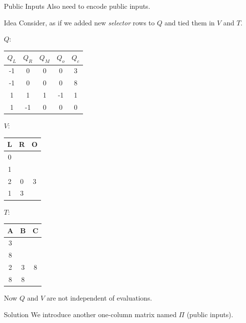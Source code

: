 \documentclass{zkdl-presentation-template}
\begin{document}
    \begin{frame}{Public Inputs}
        Also need to encode public inputs.
        \begin{block}{Idea}
            Consider, as if we added new \textit{selector} rows to $Q$ and tied them in $V$ and $T$.
        \end{block}

        \begin{example}
            \scriptsize
            \begin{center}
            $Q$: 
                \begin{tabular}{|c|c|c|c|c|}
                    \hline
                    $Q_L$ & $Q_R$ & $Q_M$ & $Q_o$ & $Q_c$ \\ 
                    \hline
                    -1 & 0 & 0 & 0 & 3 \\ 
                    \hline
                    -1 & 0 & 0 & 0 & 8 \\ 
                    \hline
                    1 & 1 & 1 & -1 & 1 \\ 
                    \hline
                    1 & -1 & 0 & 0 & 0 \\ 
                    \hline
                \end{tabular}
            \quad $V$:
                \begin{tabular}{|c|c|c|}
                    \hline
                    L & R & O \\
                    \hline
                    0 &  &  \\
                    \hline
                    1 &  &  \\
                    \hline
                    2 & 0 & 3 \\
                    \hline
                    1 & 3 &  \\
                    \hline
                \end{tabular}
             \quad $T$:
                \begin{tabular}{|c|c|c|}
                    \hline
                    A & B & C \\
                    \hline
                    3 &  &  \\
                    \hline
                    8 &  &  \\
                    \hline
                    2 & 3 & 8 \\
                    \hline
                    8 & 8 &  \\
                    \hline
                \end{tabular}
            \end{center}
        \end{example}

        \pause Now $Q$ and $V$ are not independent of evaluations. 
        \begin{block}{Solution}
            We introduce another one-column matrix named $\Pi$ (public inputs).
        \end{block}
    \end{frame}
\end{document}
